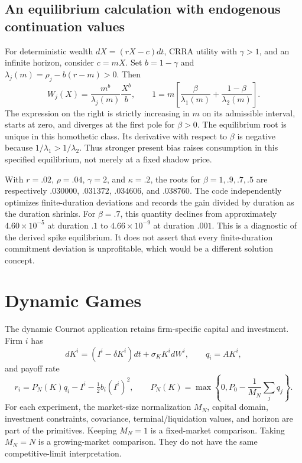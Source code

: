 \documentclass[ecta,draft]{econsocart}
\theoremstyle{definition}
\theoremstyle{remark}
\begin{document}
\subsection{An equilibrium calculation with endogenous continuation values}
For deterministic wealth $dX=(rX-c)dt$, CRRA utility with $\gamma>1$, and an infinite horizon, consider $c=mX$. Set $b=1-\gamma$ and $\lambda_j(m)=\rho_j-b(r-m)>0$. Then
\begin{equation}\label{eq:temporalroot}
 W_j(X)=\frac{m^b}{\lambda_j(m)}\frac{X^b}{b},\qquad
 1=m\left[\frac\beta{\lambda_1(m)}+\frac{1-\beta}{\lambda_2(m)}\right].
\end{equation}
The expression on the right is strictly increasing in $m$ on its admissible interval, starts at zero, and diverges at the first pole for $\beta>0$. The equilibrium root is unique in this homothetic class. Its derivative with respect to $\beta$ is negative because $1/\lambda_1>1/\lambda_2$. Thus stronger present bias raises consumption in this specified equilibrium, not merely at a fixed shadow price.

With $r=.02$, $\rho=.04$, $\gamma=2$, and $\kappa=.2$, the roots for $\beta=1,.9,.7,.5$ are respectively $.030000$, $.031372$, $.034606$, and $.038760$. The code independently optimizes finite-duration deviations and records the gain divided by duration as the duration shrinks. For $\beta=.7$, this quantity declines from approximately $4.60\times10^{-5}$ at duration $.1$ to $4.66\times10^{-9}$ at duration $.001$. This is a diagnostic of the derived spike equilibrium. It does not assert that every finite-duration commitment deviation is unprofitable, which would be a different solution concept.

\section{Dynamic Games}\label{sec:games}
The dynamic Cournot application retains firm-specific capital and investment. Firm $i$ has
\[
 dK^i=(I^i-\delta K^i)dt+\sigma_K K^i dW^i,\qquad q_i=AK^i,
\]
and payoff rate
\[
 r_i=P_N(K)q_i-I^i-\tfrac12 b_i(I^i)^2,\qquad
 P_N(K)=\max\left\{0,P_0-\frac1{M_N}\sum_jq_j\right\}.
\]
For each experiment, the market-size normalization $M_N$, capital domain, investment constraints, covariance, terminal/liquidation values, and horizon are part of the primitives. Keeping $M_N=1$ is a fixed-market comparison. Taking $M_N=N$ is a growing-market comparison. They do not have the same competitive-limit interpretation.
\end{document}
